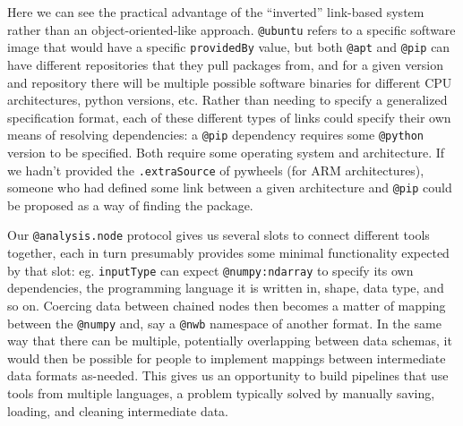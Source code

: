 \begin{Shaded}
\begin{Highlighting}[]

\end{Highlighting}
\end{Shaded}

Here we can see the practical advantage of the ``inverted'' link-based
system rather than an object-oriented-like approach. \texttt{@ubuntu}
refers to a specific software image that would have a specific
\texttt{providedBy} value, but both \texttt{@apt} and \texttt{@pip} can
have different repositories that they pull packages from, and for a
given version and repository there will be multiple possible software
binaries for different CPU architectures, python versions, etc. Rather
than needing to specify a generalized specification format, each of
these different types of links could specify their own means of
resolving dependencies: a \texttt{@pip} dependency requires some
\texttt{@python} version to be specified. Both require some operating
system and architecture. If we hadn't provided the \texttt{.extraSource}
of pywheels (for ARM architectures), someone who had defined some link
between a given architecture and \texttt{@pip} could be proposed as a
way of finding the package.

Our \texttt{@analysis.node} protocol gives us several slots to connect
different tools together, each in turn presumably provides some minimal
functionality expected by that slot: eg. \texttt{inputType} can expect
\texttt{@numpy:ndarray} to specify its own dependencies, the programming
language it is written in, shape, data type, and so on. Coercing data
between chained nodes then becomes a matter of mapping between the
\texttt{@numpy} and, say a \texttt{@nwb} namespace of another format. In
the same way that there can be multiple, potentially overlapping between
data schemas, it would then be possible for people to implement mappings
between intermediate data formats as-needed. This gives us an
opportunity to build pipelines that use tools from multiple languages, a
problem typically solved by manually saving, loading, and cleaning
intermediate data.

